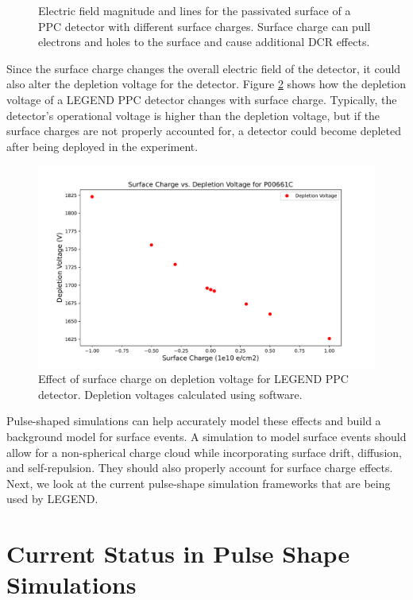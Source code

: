 \begin{figure}
\caption{Electric field magnitude and lines for the passivated surface of a PPC detector with different surface charges. Surface charge can pull electrons and holes to the surface and cause additional DCR effects.}
\label{ch3_fig_surface_field_sc0}
\end{figure}


Since the surface charge changes the overall electric field of the detector, it could also alter the depletion voltage for the detector. Figure \ref{ch3_fig_deplection_sc} shows how the depletion voltage of a LEGEND PPC detector changes with surface charge. Typically, the detector's operational voltage is higher than the depletion voltage, but if the surface charges are not properly accounted for, a detector could become depleted after being deployed in the experiment.

\begin{figure}[!htb]
\centering
  \includegraphics[width=0.99\linewidth]{ch3/figs/deplep_sc.pdf}
 \caption{Effect of surface charge on depletion voltage for LEGEND PPC detector. Depletion voltages calculated using {\siggen} software.}
\label{ch3_fig_deplection_sc}
  \end{figure}

Pulse-shaped simulations can help accurately model these effects and build a background model for surface events. A simulation to model surface events should allow for a non-spherical charge cloud while incorporating surface drift, diffusion, and self-repulsion. They should also properly account for surface charge effects. Next, we look at the current pulse-shape simulation frameworks that are being used by LEGEND.

\section{Current Status in Pulse Shape Simulations}

